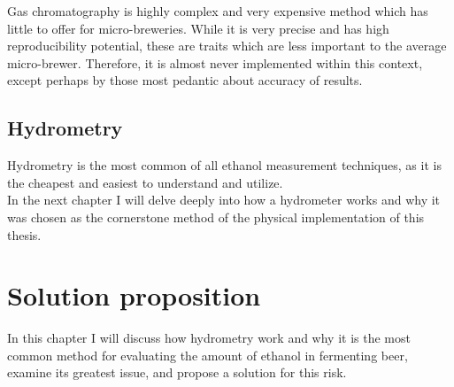 \documentclass[twoside]{ctuthesis}
\theoremstyle{plain}
\theoremstyle{definition}
\theoremstyle{note}
\begin{document}
Gas chromatography is highly complex and very expensive method which has little to offer for micro-breweries. While it is very precise and has high reproducibility potential, these are traits which are less important to the average micro-brewer. Therefore, it is almost never implemented within this context, except perhaps by those most pedantic about accuracy of results.

\newpage

\section{Hydrometry}
Hydrometry is the most common of all ethanol measurement techniques, as it is the cheapest and easiest to understand and utilize.\\
In the next chapter I will delve deeply into how a hydrometer works and why it was chosen as the cornerstone method of the physical implementation of this thesis.

\pagebreak 

\begingroup
\renewcommand{\cleardoublepage}{}
\renewcommand{\clearpage}{}
\chapter{Solution proposition}
\endgroup

In this chapter I will discuss how hydrometry work and why it is the most common method for evaluating the amount of ethanol in fermenting beer, examine its greatest issue, and propose a solution for this risk.
\end{document}
